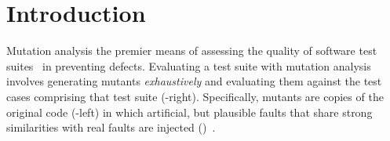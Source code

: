 \documentclass[sigconf,review,anonymous]{acmart}
\begin{document}



\maketitle

\section{Introduction}
Mutation analysis the premier means of assessing the quality of
software test suites~\cite{papadakis2019mutation} in preventing defects.
Evaluating a test suite with mutation analysis involves
generating mutants \emph{exhaustively} and evaluating them against the test cases comprising that test suite
(-right).
%
Specifically, mutants are copies of the original code (-left) in which artificial, %
but plausible faults that share strong similarities with real faults are injected ()~\cite{daran1996software,just2014are,andrews2005is,andrews2006using}.
\end{document}
